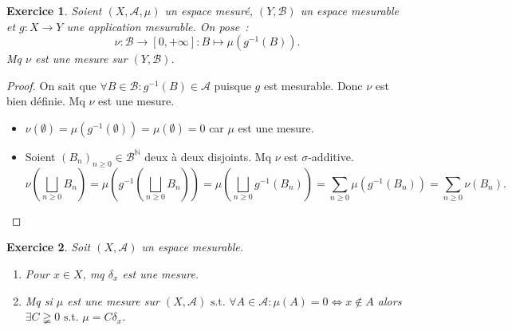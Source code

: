 \documentclass{article}
\newtheorem{ex}{Exercice}[section]
\newcommand{\pinfty}{{+\infty}}
\newcommand{\st}{\text{ s.t. }}
\newcommand{\N}{{\mathbb N}}
\begin{document}
\begin{ex} Soient $(X, \mathcal A, \mu)$ un espace mesuré, $(Y, \mathcal B)$ un espace mesurable et $g : X \to Y$ une application mesurable. On pose~:
\[\nu : \mathcal B \to [0, \pinfty] : B \mapsto \mu(g^{-1}(B)).\]
Mq $\nu$ est une mesure sur $(Y, \mathcal B)$.
\end{ex}

\begin{proof} On sait que $\forall B \in \mathcal B : g^{-1}(B) \in \mathcal A$ puisque $g$ est mesurable. Donc $\nu$ est bien définie. Mq $\nu$ est une mesure.
\begin{itemize}
	\item $\nu(\emptyset) = \mu(g^{-1}(\emptyset)) = \mu(\emptyset) = 0$ car $\mu$ est une mesure.
	\item Soient $(B_n)_{n \geq 0} \in \mathcal B^\N$ deux à deux disjoints. Mq $\nu$ est $\sigma$-additive.
	\[\nu\left(\bigsqcup_{n \geq 0}B_n\right) = \mu\left(g^{-1}\left(\bigsqcup_{n \geq 0}B_n\right)\right) = \mu\left(\bigsqcup_{n \geq 0}g^{-1}(B_n)\right)
	  = \sum_{n \geq 0}\mu(g^{-1}(B_n)) = \sum_{n \geq 0}\nu(B_n).\]
\end{itemize}
\end{proof}

\begin{ex} Soit $(X, \mathcal A)$ un espace mesurable.
\begin{enumerate}
	\item Pour $x \in X$, mq $\delta_x$ est une mesure.
	\item Mq si $\mu$ est une mesure sur $(X, \mathcal A) \st \forall A \in \mathcal A : \mu(A) = 0 \iff x \not \in A$ alors $\exists C \gneqq 0 \st \mu = C\delta_x$.
\end{enumerate}
\end{ex}
\end{document}
